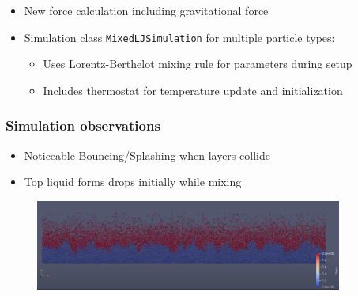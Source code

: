 \begin{frame}
    \begin{itemize}
        \item New force calculation including gravitational force
        \item Simulation class \texttt{MixedLJSimulation} for multiple particle types:
        \begin{itemize}
            \item Uses Lorentz-Berthelot mixing rule for parameters during setup
            \item Includes thermostat for temperature update and initialization
        \end{itemize}
    \end{itemize}
\end{frame}

\begin{frame}
    \frametitle{Simulation observations}
    \begin{itemize}
        \item Noticeable Bouncing/Splashing when layers collide
        \item Top liquid forms drops initially while mixing
    \end{itemize}
    \begin{figure}
        \label{fig:bounce}
        \includegraphics[width=0.9\textwidth]{../../res/rayleigh_bounce}
    \end{figure}
\end{frame}